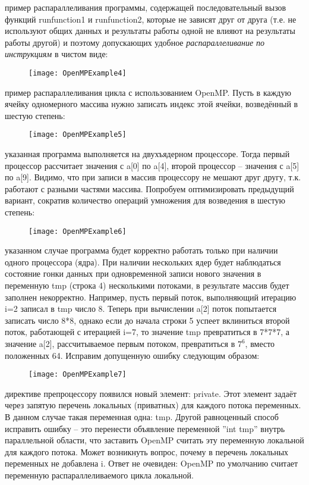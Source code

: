 {	 пример распараллеливания программы, содержащей последовательный вызов функций run\textunderscore function1 и run\textunderscore function2, которые не зависят друг от друга (т.е. не используют общих данных и результаты работы одной не влияют на результаты работы другой) и поэтому допускающих удобное \textit{распараллеливание по инструкциям} в чистом виде:
	\begin{figure}[H]
		\texttt{[image: OpenMPExample4]}
	\end{figure}
	 пример распараллеливания цикла с использованием OpenMP. Пусть в каждую ячейку одномерного массива нужно записать индекс этой ячейки, возведённый в шестую степень:
	\begin{figure}[H]
		\texttt{[image: OpenMPExample5]}
	\end{figure}
	 указанная программа выполняется на двухъядерном процессоре. Тогда первый процессор рассчитает значения с a[0] по a[4], второй процессор – значения с a[5] по a[9]. Видимо, что при записи в массив процессору не мешают друг другу, т.к. работают с разными частями массива. Попробуем оптимизировать предыдущий вариант, сократив количество операций умножения для возведения в шестую степень:
	\begin{figure}[H]
		\texttt{[image: OpenMPExample6]}
	\end{figure}
	 указанном случае программа будет корректно работать только при наличии одного процессора (ядра). При наличии нескольких ядер будет наблюдаться состояние гонки данных при одновременной записи нового значения в переменную tmp (строка 4) несколькими потоками, в результате массив будет заполнен некорректно. Например, пусть первый поток, выполняющий итерацию i=2 записал в tmp число 8. Теперь при вычислении a[2] поток попытается записать число 8*8, однако если до начала строки 5 успеет вклиниться второй поток, работающей с итерацией i=7, то значение tmp превратиться в 7*7*7, а значение a[2], рассчитываемое первым потоком, превратиться в $7^6$, вместо положенных 64. Исправим допущенную ошибку следующим образом:
	\begin{figure}[H]
		\texttt{[image: OpenMPExample7]}
	\end{figure}
	 директиве препроцессору появился новый элемент: private. Этот элемент задаёт через запятую перечень локальных (приватных) для каждого потока переменных. В данном случае такая переменная одна: tmp. Другой равноценный способ исправить ошибку – это перенести объявление переменной ''int tmp'' внутрь параллельной области, что заставить OpenMP считать эту переменную локальной для каждого потока. Может возникнуть вопрос, почему в перечень локальных переменных не добавлена i. Ответ не очевиден: OpenMP по умолчанию считает переменную распараллеливаемого цикла локальной.
}
